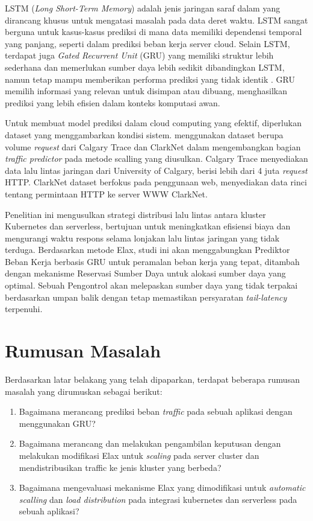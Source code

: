 LSTM (\emph{Long Short-Term Memory}) adalah jenis jaringan saraf dalam yang dirancang khusus untuk mengatasi masalah pada data deret waktu. LSTM sangat berguna untuk kasus-kasus prediksi di mana data memiliki dependensi temporal yang panjang, seperti dalam prediksi beban kerja server cloud. Selain LSTM, terdapat juga \emph{Gated Recurrent Unit} (GRU) yang memiliki struktur lebih sederhana dan memerlukan sumber daya lebih sedikit dibandingkan LSTM, namun tetap mampu memberikan performa prediksi yang tidak identik \citep{mondal2023toward}. GRU memilih informasi yang relevan untuk disimpan atau dibuang, menghasilkan prediksi yang lebih efisien dalam konteks komputasi awan.

Untuk membuat model prediksi dalam cloud computing yang efektif, diperlukan dataset yang menggambarkan kondisi sistem. \citet{yang2019elax} menggunakan dataset berupa volume \emph{request} dari Calgary Trace dan ClarkNet dalam mengembangkan bagian \emph{traffic predictor} pada metode scalling yang diusulkan. Calgary Trace menyediakan data lalu lintas jaringan dari University of Calgary, berisi lebih dari 4 juta \emph{request} HTTP. ClarkNet dataset berfokus pada penggunaan web, menyediakan data rinci tentang permintaan HTTP ke server WWW ClarkNet.

Penelitian ini mengusulkan strategi distribusi lalu lintas antara kluster Kubernetes dan serverless, bertujuan untuk meningkatkan efisiensi biaya dan mengurangi waktu respons selama lonjakan lalu lintas jaringan yang tidak terduga. Berdasarkan metode Elax, studi ini akan menggabungkan Prediktor Beban Kerja berbasis GRU untuk peramalan beban kerja yang tepat, ditambah dengan mekanisme Reservasi Sumber Daya untuk alokasi sumber daya yang optimal. Sebuah Pengontrol akan melepaskan sumber daya yang tidak terpakai berdasarkan umpan balik dengan tetap memastikan persyaratan \emph{tail-latency} terpenuhi.

\section{Rumusan Masalah}
\label{sec:rumusan-masalah}

Berdasarkan latar belakang yang telah dipaparkan, terdapat beberapa rumusan masalah yang dirumuskan sebagai berikut:

\begin{enumerate}
    \item Bagaimana merancang prediksi beban \emph{traffic} pada sebuah aplikasi dengan menggunakan GRU?
    \item Bagaimana merancang dan melakukan pengambilan keputusan dengan melakukan modifikasi Elax untuk \emph{scaling} pada server cluster dan mendistribusikan traffic ke jenis kluster yang berbeda?
    \item Bagaimana mengevaluasi mekanisme Elax yang dimodifikasi untuk \emph{automatic scalling} dan \emph{load distribution} pada integrasi kubernetes dan serverless pada sebuah aplikasi?
\end{enumerate}

